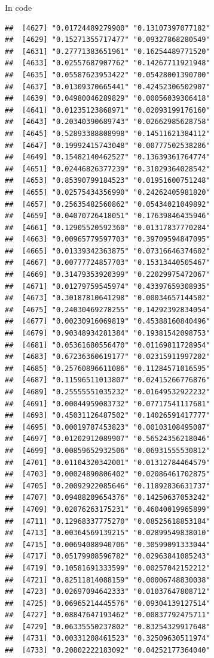 \documentclass[ignorenonframetext,]{beamer}
\begin{document}
\begin{frame}[fragile]{In code}
\begin{verbatim}
##  [4627] "0.01724489279900" "0.13107397077182"
##  [4629] "0.15271355717477" "0.09327868280549"
##  [4631] "0.27771383651961" "0.16254489771520"
##  [4633] "0.02557687907762" "0.14267711921948"
##  [4635] "0.05587623953422" "0.05428001390700"
##  [4637] "0.01309370665441" "0.42452306502907"
##  [4639] "0.04980046289829" "0.00056039306418"
##  [4641] "0.01235123868971" "0.02093199176160"
##  [4643] "0.20340390689743" "0.02662985628758"
##  [4645] "0.52893388808998" "0.14511621384112"
##  [4647] "0.19992415743048" "0.00777502538286"
##  [4649] "0.15482140462527" "0.13639361764774"
##  [4651] "0.02446826377239" "0.31029364028542"
##  [4653] "0.85390799184523" "0.01951600751248"
##  [4655] "0.02575434356990" "0.24262405981820"
##  [4657] "0.25635482560862" "0.05434021049892"
##  [4659] "0.04070726418051" "0.17639846435946"
##  [4661] "0.12905520592360" "0.01317837770284"
##  [4663] "0.00965779597703" "0.39709594847095"
##  [4665] "0.01339342363875" "0.07316646374602"
##  [4667] "0.00777724857703" "0.15313440505467"
##  [4669] "0.31479353920399" "0.22029975472067"
##  [4671] "0.01279759545974" "0.43397659308935"
##  [4673] "0.30187810641298" "0.00034657144502"
##  [4675] "0.24030469278255" "0.14292392834054"
##  [4677] "0.00230916069819" "0.45388160840496"
##  [4679] "0.90348934281384" "0.19381542098753"
##  [4681] "0.05361680556470" "0.01169811728954"
##  [4683] "0.67236360619177" "0.02315911997202"
##  [4685] "0.25760896611086" "0.11284571016595"
##  [4687] "0.11596511013807" "0.02415266776876"
##  [4689] "0.25555551035232" "0.01649532922232"
##  [4691] "0.00044959083732" "0.07717541117681"
##  [4693] "0.45031126487502" "0.14026591417777"
##  [4695] "0.00019787453823" "0.00103108495087"
##  [4697] "0.01202912089907" "0.56524356218046"
##  [4699] "0.00859652932506" "0.06931555530812"
##  [4701] "0.01104320342001" "0.01312784464579"
##  [4703] "0.00024890806402" "0.02086461702875"
##  [4705] "0.20092922085646" "0.11892836631737"
##  [4707] "0.09488209654376" "0.14250637053242"
##  [4709] "0.02076263175231" "0.46040019965899"
##  [4711] "0.12968337775270" "0.08525618853184"
##  [4713] "0.00364569139215" "0.02899549838010"
##  [4715] "0.00694088940706" "0.30599091333044"
##  [4717] "0.05179908596782" "0.02963841085243"
##  [4719] "0.10581691333599" "0.00257042152212"
##  [4721] "0.82511814088159" "0.00006748830038"
##  [4723] "0.02697094642333" "0.01037647808712"
##  [4725] "0.06965214445576" "0.09304139127514"
##  [4727] "0.08847647193462" "0.00837792475711"
##  [4729] "0.06335550237802" "0.83254329917648"
##  [4731] "0.00331208461523" "0.32509630511974"
##  [4733] "0.20802222183092" "0.04252177364040"

\end{verbatim}
\end{frame}
\end{document}
